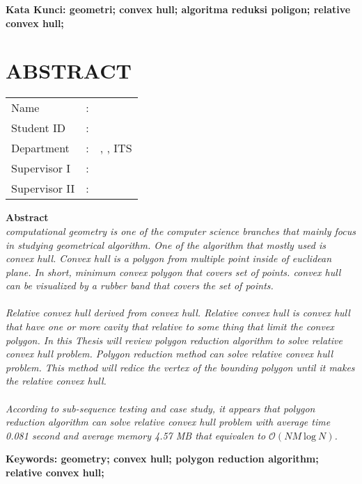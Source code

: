 \vspace*{1em}
\noindent\bfseries Kata Kunci: geometri; convex hull; algoritma reduksi poligon; relative convex hull;
\normalfont
\cleardoublepage

\chapter {ABSTRACT}
\noindent\textbf{\MakeUppercase\juduleng}
\vspace*{1em}

\begin{tabularx}{\linewidth}{ l l p{2.2in} }
	Name 			& : & \penulis \\
	Student ID		& :	& \nrp \\
	Department 		& : & \jurusaneng, \newline \fakultaseng, ITS \\
	Supervisor I 	& : & \pembimbingsatu \\
	Supervisor II 	& : & \pembimbingdua
	\vspace*{1em} 	%
\end {tabularx}
	
\noindent\textbf{Abstract} \\
\itshape
computational geometry is one of the computer science branches that mainly focus in studying geometrical algorithm. One of the algorithm that mostly used is convex hull. Convex hull is a polygon from multiple point inside of euclidean plane. In short, minimum convex polygon that covers set of points. convex hull can be visualized by a rubber band that covers the set of points.\\\\
Relative convex hull derived from convex hull. Relative convex hull is convex hull that have one or more cavity that relative to some thing that limit the convex polygon. In this Thesis will review polygon reduction algorithm to solve relative convex hull problem. Polygon reduction method can solve relative convex hull problem. This method will redice the vertex of the bounding polygon until it makes the relative convex hull. \\\\
According to sub-sequence testing and case study, it appears that polygon reduction algorithm can solve relative convex hull problem with average time 0.081 second and average memory 4.57 MB that equivalen to $\mathcal{O}{(NM\ \text{log}\ N)}$.

\vspace*{1em}
\noindent\bfseries Keywords: geometry; convex hull; polygon reduction algorithm; relative convex hull;
\normalfont
\cleardoublepage
